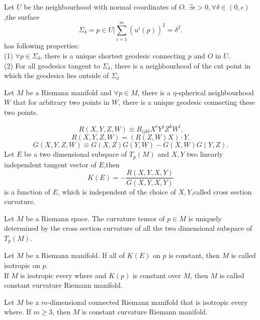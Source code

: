 \begin{newthem}
Let $U$ be the neighbourhood with normal coordinates of $O$. $\exists \epsilon >0, \forall \delta \in (0,\epsilon)$,the surface
\[\Sigma_{\delta} = {p \in U | \sum_{i=1}^{m}} (u^i(p))^2 = \delta^2.\]
has following properties:\\
(1) $\forall p \in \Sigma_{\delta}$, there is a unique shortest geodesic connecting $p$ and $O$ in $U$.\\
(2) For all geodesics tangent to $\Sigma_{\delta}$, there is a neighbourhood of the cut point in which the geodesics lies outside of $\Sigma_{\delta}$
\end{newthem}

\begin{newthem}
Let $M$ be a Riemann manifold and $\forall p \in M$, there is a $\eta$-spherical neighbourhood $W$ that for arbitrary two points in $W$, there is a unique geodesic connecting these two points.
\end{newthem}

\begin{newdef}
\[R(X,Y,Z,W) \equiv R_{ijkl}X^iY^jZ^kW^l.\]
\[R(X,Y,Z,W) = (R(Z,W)X) \cdot Y.\]
\[G(X,Y,Z,W) \equiv G(X,Z)G(Y,W) - G(X,W)G(Y,Z).\]
Let $E$ be a two dimensional subspace of $T_p(M)$ and $X,Y$ two linearly independent tangent vector of $E$,then
\[K(E) = -\frac{R(X,Y,X,Y)}{G(X,Y,X,Y)} \]
is a function of $E$, which is independent of the choice of $X,Y$,called cross section curvature.
\end{newdef}

\begin{newthem} 
Let $M$ be a Riemann space. The curvature tensor of $p \in M$ is uniquely determined by the cross section curvature of all the two dimensional subspace of $T_p(M)$.
\end{newthem}

\begin{newdef}
Let $M$ be a Riemann manifold. If all of $K(E)$ on $p$ is constant, then $M$ is called isotropic on $p$. \\
If $M$ is isotropic every where and $K(p)$ is constant over $M$, then $M$ is called constant curvature Riemann manifold.
\end{newdef}

\begin{newthem} 
Let $M$ be a $m$-dimensional connected Riemann manifold that is isotropic every where. If $m \geq 3$, then $M$ is constant curvature Riemann manifold.
\end{newthem}

